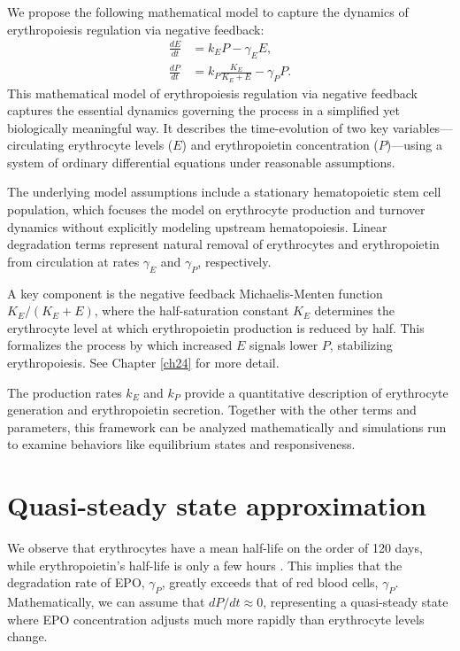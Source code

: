 We propose the following mathematical model to capture the dynamics of erythropoiesis regulation via negative feedback:
\begin{align}
\frac{d E}{dt} &= k_E P - \gamma_E E,  \label{eq:22.01} \\
\frac{d P}{dt} &= k_P \frac{K_E}{K_E + E} - \gamma_P P.  \label{eq:22.02}
\end{align}
This mathematical model of erythropoiesis regulation via negative feedback captures the essential dynamics governing the process in a simplified yet biologically meaningful way. It describes the time-evolution of two key variables---circulating erythrocyte levels ($E$) and erythropoietin concentration ($P$)---using a system of ordinary differential equations under reasonable assumptions.

The underlying model assumptions include a stationary hematopoietic stem cell population, which focuses the model on erythrocyte production and turnover dynamics without explicitly modeling upstream hematopoiesis. Linear degradation terms represent natural removal of erythrocytes and erythropoietin from circulation at rates $\gamma_E$ and $\gamma_P$, respectively.

A key component is the negative feedback Michaelis-Menten function $K_E/(K_E + E)$, where the half-saturation constant $K_E$ determines the erythrocyte level at which erythropoietin production is reduced by half. This formalizes the process by which increased $E$ signals lower $P$, stabilizing erythropoiesis. See Chapter \ref{ch24} for more detail.

The production rates $k_E$ and $k_P$ provide a quantitative description of erythrocyte generation and erythropoietin secretion. Together with the other terms and parameters, this framework can be analyzed mathematically and simulations run to examine behaviors like equilibrium states and responsiveness.

\section{Quasi-steady state approximation}

We observe that erythrocytes have a mean half-life on the order of 120 days, while erythropoietin's half-life is only a few hours \citep{Belair1995}. This implies that the degradation rate of EPO, $\gamma_P$, greatly exceeds that of red blood cells, $\gamma_P$. Mathematically, we can assume that $dP/dt \approx 0$, representing a quasi-steady state where EPO concentration adjusts much more rapidly than erythrocyte levels change.

